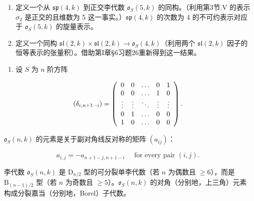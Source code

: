 \begin{enumerate}
\def\labelenumi{\alph{enumi})}
\setcounter{enumi}{1}
\item
  定义一个从 \(\mathfrak{sp}(4,k)\) 到正交李代数 \(\mathfrak{o}_S(5,k)\) 的同构。（利用第3节.V 的表示 \(\sigma_2\) 是正交的且维数为 5 这一事实。）\(\mathfrak{sp}(4,k)\) 的次数为 4 的不可约表示对应于 \(\mathfrak{o}_S(5,k)\) 的旋量表示。
\item
  定义一个同构 \(\mathfrak{sl}(2,k)\times\mathfrak{sl}(2,k)\to\mathfrak{o}_{S}(4,k)\)（利用两个 \(\mathfrak{sl}(2,k)\) 因子的恒等表示的张量积）。借助第I章§6习题26重新得到这一结果。
\end{enumerate}

\begin{enumerate}
\def\labelenumi{\arabic{enumi})}
\setcounter{enumi}{3}
\tightlist
\item
  设 \(S\) 为 \(n\) 阶方阵
\end{enumerate}

\[
(\delta_ {i, n + 1 - i}) = \left( \begin{array}{c c c c c} 0 & 0 & \dots & 0 & 1 \\ 0 & 0 & \dots & 1 & 0 \\ \vdots & \vdots & \ddots & \vdots & \vdots \\ 0 & 1 & \dots & 0 & 0 \\ 1 & 0 & \dots & 0 & 0 \end{array} \right).
\]

\(\mathfrak{o}_{S}(n,k)\) 的元素是关于副对角线反对称的矩阵 \((a_{ij})\)：

\[
a _ {i, j} = - a _ {n + 1 - j, n + 1 - i} \quad \text {   for   every   pair   } (i, j).
\]

李代数 \(\mathfrak{o}_S(n,k)\) 是 \(\mathrm{D}_{n/2}\) 型的可分裂单李代数（若 \(n\) 为偶数且 \(\geq 6\)），而是 \(\mathrm{B}_{(n-1)/2}\) 型（若 \(n\) 为奇数且 \(\geq 5\)）。\(\mathfrak{o}_S(n,k)\) 的对角（分别地，上三角）元素构成分裂嘉当（分别地，Borel）子代数。

